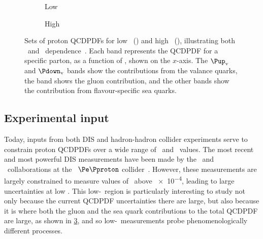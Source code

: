 
\begin{figure}
  \begin{subfigure}[b]{0.5\textwidth}
    \centering
    
    \caption{Low \pdfqsquared}
    \label{fig:prod:theory:pdf_sets:low_qsquared}
  \end{subfigure}
  \begin{subfigure}[b]{0.5\textwidth}
    \centering
    
    \caption{High \pdfqsquared}
    \label{fig:prod:theory:pdf_sets:high_qsquared}
  \end{subfigure}
  \caption{%
    Sets of proton \aclp{QCDPDF} for low \pdfqsquared\ 
    () and high \pdfqsquared\ 
    (), illustrating both 
    \bjorkenx\ and \pdfqsquared\ dependence~\cite{PDG2014}.
    Each band represents the \ac{QCDPDF} for a specific parton, as a function 
    of \bjorkenx, shown on the $x$-axis.
    The $\Pup_{\text{v}}$ and $\Pdown_{\text{v}}$ bands show the contributions 
    from the valance quarks, the \Pgluon band shows the gluon contribution, and 
    the other bands show the contribution from flavour-specific sea quarks.
  }
  \label{fig:prod:theory:pdf_sets}
\end{figure}

\subsection{Experimental input}
\label{chap:prod:theory:pdfs:inputs}

Today, inputs from both \ac{DIS} and hadron-hadron collider experiments serve 
to constrain proton \acp{QCDPDF} over a wide range of \bjorkenx\ and 
\pdfqsquared\ values.
The most recent and most powerful \ac{DIS} measurements have been made by the 
\hone\ and \zeus\ collaborations at the \hera\ $\Pe\Pproton$ 
collider~\cite{Abramowicz:1900rp}.
However, these measurements are largely constrained to measure values of 
\bjorkenx\ above \num{e-4}, leading to large uncertainties at low \bjorkenx.
This low-\bjorkenx\ region is particularly interesting to study not only 
because the current \ac{QCDPDF} uncertainties there are large, but also because 
it is where both the gluon and the sea quark contributions to the total 
\ac{QCDPDF} are large, as shown in \cref{fig:prod:theory:pdf_sets}, and so 
low-\bjorkenx\ measurements probe phenomenologically different processes.

